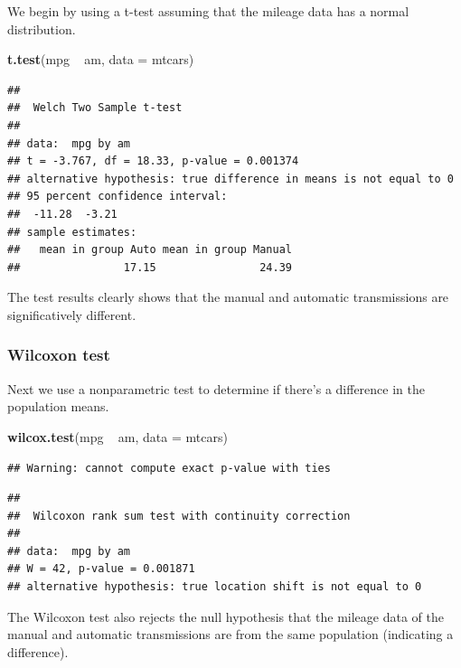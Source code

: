 \documentclass[a3paper]{article}
\newenvironment{Shaded}{\begin{snugshade}}{\end{snugshade}}
\newcommand{\KeywordTok}[1]{\textcolor[rgb]{0.13,0.29,0.53}{\textbf{{#1}}}}
\newcommand{\DataTypeTok}[1]{\textcolor[rgb]{0.13,0.29,0.53}{{#1}}}
\newcommand{\StringTok}[1]{\textcolor[rgb]{0.31,0.60,0.02}{{#1}}}
\newcommand{\NormalTok}[1]{{#1}}
\begin{document}
We begin by using a t-test assuming that the mileage data has a normal
distribution.

\begin{Shaded}
\begin{Highlighting}[]
\KeywordTok{t.test}\NormalTok{(mpg ~}\StringTok{ }\NormalTok{am, }\DataTypeTok{data =} \NormalTok{mtcars)}
\end{Highlighting}
\end{Shaded}

\begin{verbatim}
## 
##  Welch Two Sample t-test
## 
## data:  mpg by am
## t = -3.767, df = 18.33, p-value = 0.001374
## alternative hypothesis: true difference in means is not equal to 0
## 95 percent confidence interval:
##  -11.28  -3.21
## sample estimates:
##   mean in group Auto mean in group Manual 
##                17.15                24.39
\end{verbatim}

The test results clearly shows that the manual and automatic
transmissions are significatively different.

\subsubsection{Wilcoxon test}\label{wilcoxon-test}

Next we use a nonparametric test to determine if there's a difference in
the population means.

\begin{Shaded}
\begin{Highlighting}[]
\KeywordTok{wilcox.test}\NormalTok{(mpg ~}\StringTok{ }\NormalTok{am, }\DataTypeTok{data =} \NormalTok{mtcars)}
\end{Highlighting}
\end{Shaded}

\begin{verbatim}
## Warning: cannot compute exact p-value with ties
\end{verbatim}

\begin{verbatim}
## 
##  Wilcoxon rank sum test with continuity correction
## 
## data:  mpg by am
## W = 42, p-value = 0.001871
## alternative hypothesis: true location shift is not equal to 0
\end{verbatim}

The Wilcoxon test also rejects the null hypothesis that the mileage data
of the manual and automatic transmissions are from the same population
(indicating a difference).
\end{document}
